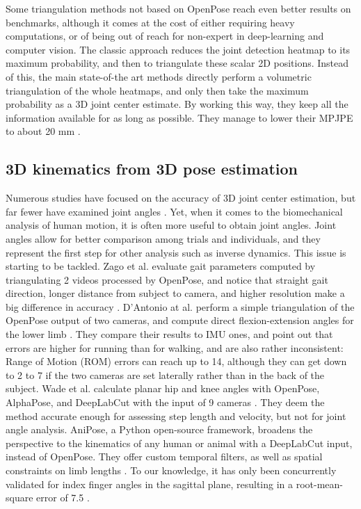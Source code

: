 Some triangulation methods not based on OpenPose reach even better results on benchmarks, although it comes at the cost of either requiring heavy computations, or of being out of reach for non-expert in deep-learning and computer vision. The classic approach reduces the joint detection heatmap to its maximum probability, and then to triangulate these scalar 2D positions. Instead of this, the main state-of-the art methods directly perform a volumetric triangulation of the whole heatmaps, and only then take the maximum probability as a 3D joint center estimate. By working this way, they keep all the information available for as long as possible. They manage to lower their MPJPE to about 20 mm \cite{He2020,Iskakov2019}. 


\subsection{3D kinematics from 3D pose estimation}

Numerous studies have focused on the accuracy of 3D joint center estimation, but far fewer have examined joint angles \cite{Zheng2022}. Yet, when it comes to the biomechanical analysis of human motion, it is often more useful to obtain joint angles. Joint angles allow for better comparison among trials and individuals, and they represent the first step for other analysis such as inverse dynamics. This issue is starting to be tackled. Zago et al. evaluate gait parameters computed by triangulating 2 videos processed by OpenPose, and notice that straight gait direction, longer distance from subject to camera, and higher resolution make a big difference in accuracy \cite{Zago2020}. D’Antonio at al. perform a simple triangulation of the OpenPose output of two cameras, and compute direct flexion-extension angles for the lower limb \cite{D'Antonio2021}. They compare their results to IMU ones, and point out that errors are higher for running than for walking, and are also rather inconsistent: Range of Motion (ROM) errors can reach up to 14\degree{}, although they can get down to 2 to 7\degree{} if the two cameras are set laterally rather than in the back of the subject. Wade et al. calculate planar hip and knee angles with OpenPose, AlphaPose, and DeepLabCut with the input of 9 cameras \cite{Wade2021}. They deem the method accurate enough for assessing step length and velocity, but not for joint angle analysis. AniPose, a Python open-source framework, broadens the perspective to the kinematics of any human or animal with a DeepLabCut input, instead of OpenPose. They offer custom temporal filters, as well as spatial constraints on limb lengths \cite{Karashchuk2021}. To our knowledge, it has only been concurrently validated for index finger angles in the sagittal plane, resulting in a root-mean-square error of 7.5\degree{} \cite{Geelen2021}.

